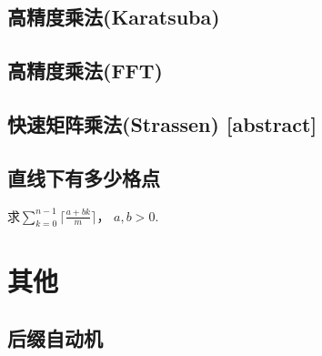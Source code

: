 \documentclass[a4papar,landscape]{article}
\begin{document}
\begin{multicols}{2}
	\subsection{高精度乘法(Karatsuba)}
		
	\subsection{高精度乘法(FFT)}
		
	\subsection{快速矩阵乘法(Strassen) [abstract]}
		
	\subsection{直线下有多少格点}
		求$\sum_{k=0}^{n-1} \lceil \frac{a+bk}{m}\rceil$，
			$a,b>0$.
		



\section{其他}

	\subsection{后缀自动机}
		


\end{multicols}
\end{document}
